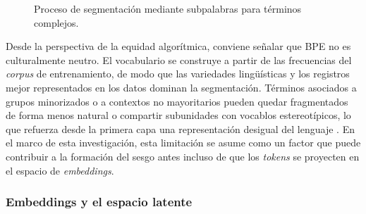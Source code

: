 \documentclass[12pt,a4paper]{report}
\begin{document}
\begin{figure}[H]
  \centering
  \caption{Proceso de segmentación mediante subpalabras para términos complejos.}
  \label{fig:token_proceso}
\end{figure}

Desde la perspectiva de la equidad algorítmica, conviene señalar que BPE no es culturalmente neutro. El vocabulario se construye a partir de las frecuencias del \textit{corpus} de entrenamiento, de modo que las variedades lingüísticas y los registros mejor representados en los datos dominan la segmentación. Términos asociados a grupos minorizados o a contextos no mayoritarios pueden quedar fragmentados de forma menos natural o compartir subunidades con vocablos estereotípicos, lo que refuerza desde la primera capa una representación desigual del lenguaje \cite{sennrich-etal-2016-neural}. En el marco de esta investigación, esta limitación se asume como un factor que puede contribuir a la formación del sesgo antes incluso de que los \textit{tokens} se proyecten en el espacio de \textit{embeddings}.

\subsubsection{Embeddings y el espacio latente}
\label{subsubsec:embeddings}
\end{document}
